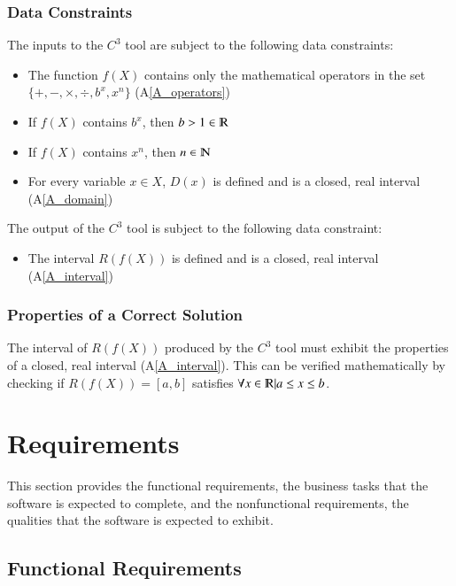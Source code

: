 \documentclass[12pt]{article}
\newcommand{\aref}[1]{A\ref{#1}}
\newcommand{\prognameAbbrv}{$C^{3}$}
\begin{document}
\subsubsection{Data Constraints} \label{sec_DataConstraints}  
The inputs to the \prognameAbbrv{} tool are subject to the following data 
constraints:

\begin{itemize}
	\item The function $f(X)$ contains only the mathematical operators in 
	the set $\{+, -, \times, \div, b^x, x^n \}$ (\aref{A_operators})
	\item If $f(X)$ contains $b^x$, then $b > 1 \in \varmathbb{R}$
	\item If $f(X)$ contains $x^n$, then $n \in \varmathbb{N}$
	\item For every variable $x \in X$, $D(x)$ is defined and is a closed, real 
	interval (\aref{A_domain})
\end{itemize}

\noindent
The output of the \prognameAbbrv{} tool is subject to the following data 
constraint:

\begin{itemize}
	\item The interval $R(f(X))$ is defined and is a closed, real interval 
	(\aref{A_interval})
\end{itemize}

\subsubsection{Properties of a Correct Solution} \label{sec_CorrectSolution}

\noindent
The interval of $R(f(X))$ produced by the \prognameAbbrv{} tool must exhibit 
the properties of a closed, real interval (\aref{A_interval}). This can be 
verified mathematically by checking if $R(f(X)) = [a,b]$ satisfies $\forall x 
\in \varmathbb{R} | a \leq x \leq 
b$.


\section{Requirements}
\label{requirements}

This section provides the functional requirements, the business tasks that the
software is expected to complete, and the nonfunctional requirements, the
qualities that the software is expected to exhibit.

\subsection{Functional Requirements}
\end{document}
